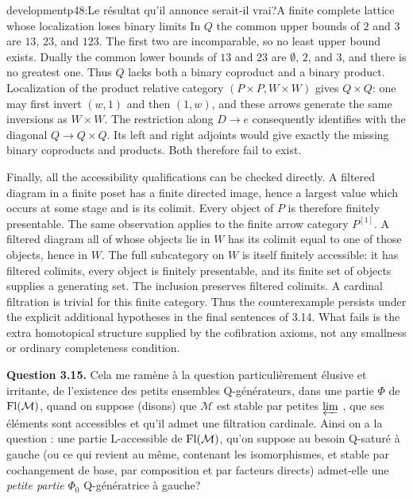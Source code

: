 \begin{dcomment}{development}{p48:Le résultat qu'il annonce serait-il vrai?}{A finite complete lattice whose localization loses binary limits}
In $Q$ the common upper bounds of $2$ and $3$ are $13$, $23$, and $123$. The first two are incomparable, so no least upper bound exists. Dually the common lower bounds of $13$ and $23$ are $\emptyset$, $2$, and $3$, and there is no greatest one. Thus $Q$ lacks both a binary coproduct and a binary product. Localization of the product relative category $(P\times P,W\times W)$ gives $Q\times Q$: one may first invert $(w,1)$ and then $(1,w)$, and these arrows generate the same inversions as $W\times W$. The restriction along $D\to e$ consequently identifies with the diagonal $Q\to Q\times Q$. Its left and right adjoints would give exactly the missing binary coproducts and products. Both therefore fail to exist.

Finally, all the accessibility qualifications can be checked directly. A filtered diagram in a finite poset has a finite directed image, hence a largest value which occurs at some stage and is its colimit. Every object of $P$ is therefore finitely presentable. The same observation applies to the finite arrow category $P^{[1]}$. A filtered diagram all of whose objects lie in $W$ has its colimit equal to one of those objects, hence in $W$. The full subcategory on $W$ is itself finitely accessible: it has filtered colimits, every object is finitely presentable, and its finite set of objects supplies a generating set. The inclusion preserves filtered colimits. A cardinal filtration is trivial for this finite category. Thus the counterexample persists under the explicit additional hypotheses in the final sentences of 3.14. What fails is the extra homotopical structure supplied by the cofibration axioms, not any smallness or ordinary completeness condition.
\end{dcomment}


\textbf{Question 3.15.} Cela me ramène à la question particulièrement élusive et irritante, de l'existence des petits ensembles Q-générateurs, dans une partie $\Phi$ de $\mathrm{Fl}(\mathcal{M})$, quand on suppose (disons) que $\mathcal{M}$ est stable par petites $\varprojlim$ , que ses éléments sont accessibles et qu'il admet une filtration cardinale. Ainsi on a la question : une partie L-accessible de $\mathrm{Fl}(\mathcal{M})$, qu'on suppose au besoin Q-saturé à gauche (ou ce qui revient au même, contenant les isomorphismes, et stable par cochangement de base, par composition et par facteurs directs) admet-elle une \textit{petite partie} $\Phi_0$ Q-génératrice à gauche? %

